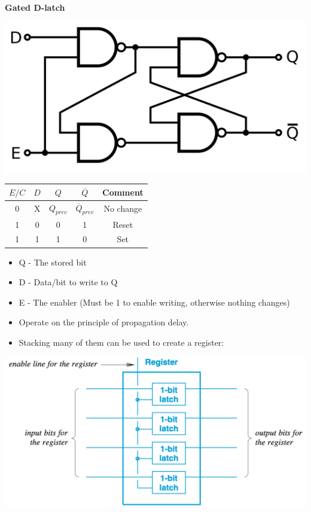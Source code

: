 \documentclass[letterpaper, 8pt]{extarticle}
\begin{document}
\begin{multicols*}{4}
	\textbf{Gated D-latch} \\
	\begin{center}
		\includegraphics[width=.6\linewidth]{gated-d-latch.png}
		\begin{tabular}[!ht]{@{}cc|ccc@{}}
			\toprule
			$E/C$ & $D$ & $Q$               & $\overline{Q}$               & Comment   \\
			\midrule
			0     & X   & $Q_\textit{prev}$ & $\overline{Q}_\textit{prev}$ & No change \\
			1     & 0   & 0                 & 1                            & Reset     \\
			1     & 1   & 1                 & 0                            & Set       \\
			\bottomrule
		\end{tabular}
	\end{center}
	\begin{itemize}
		\item Q - The stored bit
		\item D - Data/bit to write to Q
		\item E - The enabler (Must be 1 to enable writing, otherwise nothing changes)
		\item Operate on the principle of propagation delay.
		\item Stacking many of them can be used to create a register:
	\end{itemize}

	\includegraphics[width=\linewidth]{register.png}


\end{multicols*}
\end{document}
